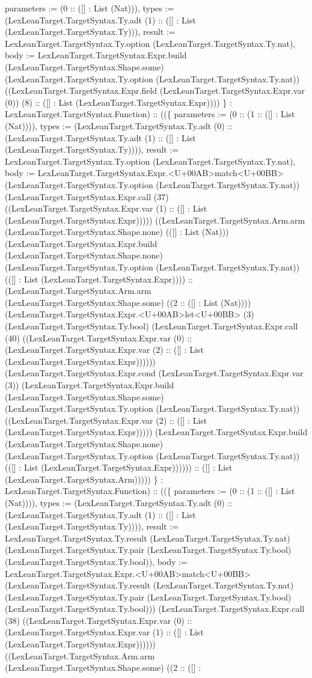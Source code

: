 \documentclass[11pt]{article}
\begin{document}
parameters := (0 :: ([] : List (Nat))), types := (LexLeanTarget.TargetSyntax.Ty.adt (1) :: ([] : List (LexLeanTarget.TargetSyntax.Ty))), result := LexLeanTarget.TargetSyntax.Ty.option (LexLeanTarget.TargetSyntax.Ty.nat), body := LexLeanTarget.TargetSyntax.Expr.build (LexLeanTarget.TargetSyntax.Shape.some) (LexLeanTarget.TargetSyntax.Ty.option (LexLeanTarget.TargetSyntax.Ty.nat)) ((LexLeanTarget.TargetSyntax.Expr.field (LexLeanTarget.TargetSyntax.Expr.var (0)) (8) :: ([] : List (LexLeanTarget.TargetSyntax.Expr)))) \} : LexLeanTarget.TargetSyntax.Function) :: ((\{ parameters := (0 :: (1 :: ([] : List (Nat)))), types := (LexLeanTarget.TargetSyntax.Ty.adt (0) :: (LexLeanTarget.TargetSyntax.Ty.adt (1) :: ([] : List (LexLeanTarget.TargetSyntax.Ty)))), result := LexLeanTarget.TargetSyntax.Ty.option (LexLeanTarget.TargetSyntax.Ty.nat), body := LexLeanTarget.TargetSyntax.Expr.<U+00AB>match<U+00BB> (LexLeanTarget.TargetSyntax.Ty.option (LexLeanTarget.TargetSyntax.Ty.nat)) (LexLeanTarget.TargetSyntax.Expr.call (37) ((LexLeanTarget.TargetSyntax.Expr.var (1) :: ([] : List (LexLeanTarget.TargetSyntax.Expr))))) ((LexLeanTarget.TargetSyntax.Arm.arm (LexLeanTarget.TargetSyntax.Shape.none) (([] : List (Nat))) (LexLeanTarget.TargetSyntax.Expr.build (LexLeanTarget.TargetSyntax.Shape.none) (LexLeanTarget.TargetSyntax.Ty.option (LexLeanTarget.TargetSyntax.Ty.nat)) (([] : List (LexLeanTarget.TargetSyntax.Expr)))) :: (LexLeanTarget.TargetSyntax.Arm.arm (LexLeanTarget.TargetSyntax.Shape.some) ((2 :: ([] : List (Nat)))) (LexLeanTarget.TargetSyntax.Expr.<U+00AB>let<U+00BB> (3) (LexLeanTarget.TargetSyntax.Ty.bool) (LexLeanTarget.TargetSyntax.Expr.call (40) ((LexLeanTarget.TargetSyntax.Expr.var (0) :: (LexLeanTarget.TargetSyntax.Expr.var (2) :: ([] : List (LexLeanTarget.TargetSyntax.Expr)))))) (LexLeanTarget.TargetSyntax.Expr.cond (LexLeanTarget.TargetSyntax.Expr.var (3)) (LexLeanTarget.TargetSyntax.Expr.build (LexLeanTarget.TargetSyntax.Shape.some) (LexLeanTarget.TargetSyntax.Ty.option (LexLeanTarget.TargetSyntax.Ty.nat)) ((LexLeanTarget.TargetSyntax.Expr.var (2) :: ([] : List (LexLeanTarget.TargetSyntax.Expr))))) (LexLeanTarget.TargetSyntax.Expr.build (LexLeanTarget.TargetSyntax.Shape.none) (LexLeanTarget.TargetSyntax.Ty.option (LexLeanTarget.TargetSyntax.Ty.nat)) (([] : List (LexLeanTarget.TargetSyntax.Expr)))))) :: ([] : List (LexLeanTarget.TargetSyntax.Arm))))) \} : LexLeanTarget.TargetSyntax.Function) :: ((\{ parameters := (0 :: (1 :: ([] : List (Nat)))), types := (LexLeanTarget.TargetSyntax.Ty.adt (0) :: (LexLeanTarget.TargetSyntax.Ty.adt (1) :: ([] : List (LexLeanTarget.TargetSyntax.Ty)))), result := LexLeanTarget.TargetSyntax.Ty.result (LexLeanTarget.TargetSyntax.Ty.nat) (LexLeanTarget.TargetSyntax.Ty.pair (LexLeanTarget.TargetSyntax.Ty.bool) (LexLeanTarget.TargetSyntax.Ty.bool)), body := LexLeanTarget.TargetSyntax.Expr.<U+00AB>match<U+00BB> (LexLeanTarget.TargetSyntax.Ty.result (LexLeanTarget.TargetSyntax.Ty.nat) (LexLeanTarget.TargetSyntax.Ty.pair (LexLeanTarget.TargetSyntax.Ty.bool) (LexLeanTarget.TargetSyntax.Ty.bool))) (LexLeanTarget.TargetSyntax.Expr.call (38) ((LexLeanTarget.TargetSyntax.Expr.var (0) :: (LexLeanTarget.TargetSyntax.Expr.var (1) :: ([] : List (LexLeanTarget.TargetSyntax.Expr)))))) ((LexLeanTarget.TargetSyntax.Arm.arm (LexLeanTarget.TargetSyntax.Shape.some) ((2 :: ([] : 
\end{document}
